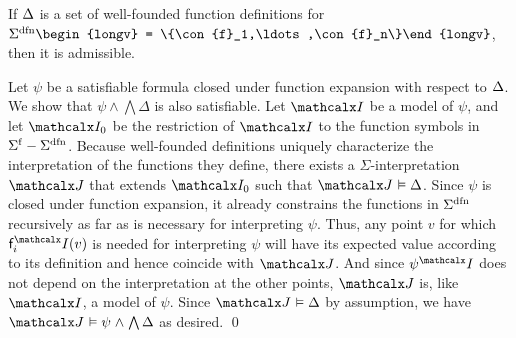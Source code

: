 \begin{theorem}\label{thm:adm}
If $\DDD$ is a set of well-founded function definitions for\/
$\sfundefs{\Sigma} \begin{longv} = \{\con{f}_1,\ldots,\con{f}_n\}\end{longv}$, then it is admissible.
\end{theorem}
\begin{longv}
\begin{proofsketch}
Let $\psi$ be a satisfiable formula closed under function expansion with
respect to $\DDD$. We show that $\psi \wedge \bigwedge \Delta$ is also
satisfiable. Let $\I$ be a model of $\psi$, and
let $\I_0$ be the restriction of $\I$ to the function symbols in $\sfuns{\Sigma} -
\sfundefs{\Sigma}$. Because well-founded definitions uniquely characterize
the interpretation of the functions they define, there exists a
$\Sigma$-interpretation $\J$ that extends $\I_0$ such that $\J \models \Delta$.
%
Since $\psi$ is closed under function expansion, it already constrains the
functions in $\sfundefs{\Sigma}$ recursively as far as is
necessary for interpreting $\psi$. Thus, any point $v$ for which
$\const{f}_i^\I(v)$ is needed for interpreting $\psi$ will have its
expected value according to its definition and hence coincide with $\J$.
And since $\psi^\I$ does not depend on the interpretation at the other
points, $\J$ is, like $\I$, a model of $\psi$.
Since $\J \models \Delta$ by assumption, we have $\J \models \psi \wedge
\bigwedge \Delta$ as desired.
\qed
\end{proofsketch}
\end{longv}

